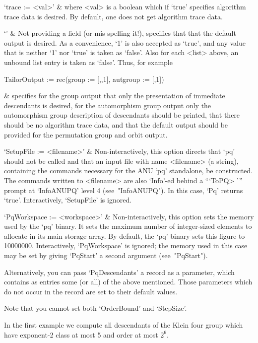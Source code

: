 \quad`trace := <val>' &
where <val> is a boolean which if `true' specifies algorithm  trace  data
is desired. By default, one does not get algorithm trace data.

`' &
Not providing a field (or mis-spelling  it!),  specifies  that  that  the
default output is desired. As a convenience,  `1'  is  also  accepted  as
`true', and any value that is neither `1' nor `true' is taken as `false'.
Also for each <list> above, an unbound list entry is  taken  as  `false'.
Thus, for example

\begintt
TailorOutput := rec(group := [,,1], autgroup := [,1])
\endtt

&
specifies for the group output that only the  presentation  of  immediate
descendants is desired,  for  the  automorphism  group  output  only  the
automorphism group description of descendants  should  be  printed,  that
there should be no algorithm trace data,  and  that  the  default  output
should be provided for the permutation group and orbit output.

`SetupFile := <filename>' &
Non-interactively, this option directs that `pq' should not be called and
that an input file  with  name  <filename>  (a  string),  containing  the
commands necessary for the  ANU  `pq'  standalone,  be  constructed.  The
commands written to <filename> are also `Info'-ed behind  a  ```ToPQ> '''
prompt at `InfoANUPQ' level  4  (see~"InfoANUPQ").  In  this  case,  `Pq'
returns `true'. Interactively, `SetupFile' is ignored.

`PqWorkspace := <workspace>' &
Non-interactively, this option sets the memory used by the  `pq'  binary.
It sets the maximum number of integer-sized elements to allocate  in  its
main storage array. By default, the  `pq'  binary  sets  this  figure  to
10000000. Interactively, `PqWorkspace' is ignored;  the  memory  used  in
this  case  may  be  set  by   giving   `PqStart'   a   second   argument
(see~"PqStart").

\enditems

Alternatively,  you can pass `PqDescendants'  a record  as  a  parameter,
which  contains  as  entries some (or all) of the above mentioned.  Those
parameters  which do not occur  in  the record are  set  to their default
values.

Note that you cannot set both `OrderBound' and `StepSize'.

In the first example  we  compute all descendants of the Klein four group
which have exponent-2 class at most 5 and order at most $2^6$.

